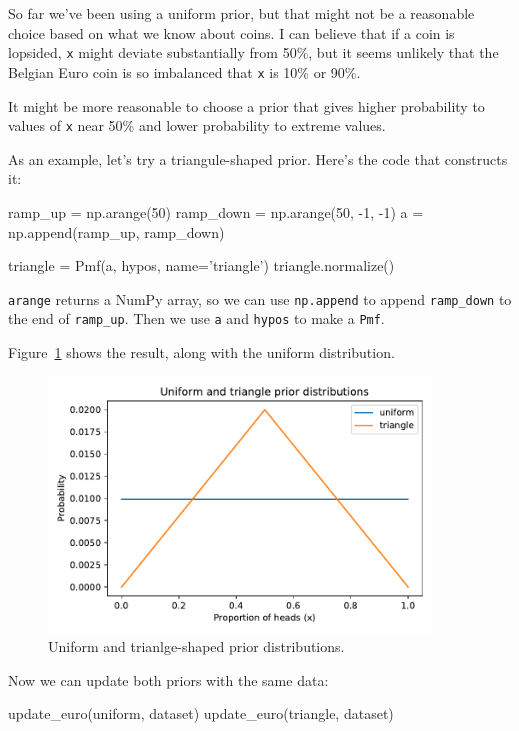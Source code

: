 \documentclass[12pt]{book}
\theoremstyle{exercise}
\newcommand{\py}[1]{{\tt #1}}%
\begin{document}
So far we've been using a uniform prior, but that might not be a reasonable choice based on what we know about coins.
I can believe that if a coin is lopsided, \py{x} might deviate substantially from 50\%, but it seems unlikely that the Belgian Euro coin is so imbalanced that \py{x} is 10\% or 90\%.

It might be more reasonable to choose a prior that gives
higher probability to values of \py{x} near 50\% and lower probability
to extreme values.


As an example, let's try a triangule-shaped prior.
Here's the code that constructs it:

\begin{code}
ramp_up = np.arange(50)
ramp_down = np.arange(50, -1, -1)
a = np.append(ramp_up, ramp_down)

triangle = Pmf(a, hypos, name='triangle')
triangle.normalize()
\end{code}

\py{arange} returns a NumPy array, so we can use \py{np.append} to append \py{ramp_down} to the end of \py{ramp_up}.
Then we use \py{a} and \py{hypos} to make a \py{Pmf}.

Figure~\ref{fig03-03} shows the result, along with the uniform distribution.

\begin{figure}
\centerline{\includegraphics[width=4in]{figs/fig03-03.pdf}}
\caption{Uniform and trianlge-shaped prior distributions.}
\label{fig03-03}
\end{figure}

Now we can update both priors with the same data:

\begin{code}
update_euro(uniform, dataset)
update_euro(triangle, dataset)
\end{code}
\end{document}
